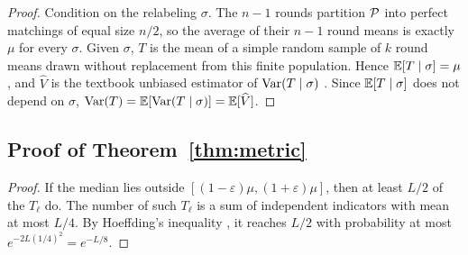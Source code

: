 
\begin{proof}
Condition on the relabeling $\sigma$. The $n-1$ rounds partition $\mathcal{P}$ into
perfect matchings of equal size $n/2$, so the average of their $n-1$ round means
is exactly $\mu$ for every $\sigma$. Given $\sigma$, $T$ is the mean of a simple
random sample of $k$ round means drawn without replacement from this finite
population. Hence $\mathbb{E}[T\mid\sigma]=\mu$, and $\widehat V$ is the textbook unbiased
estimator of $\operatorname{Var}(T\mid\sigma)$ \citep{cochran1977sampling}. Since
$\mathbb{E}[T\mid\sigma]$ does not depend on $\sigma$,
$\operatorname{Var}(T)=\mathbb{E}[\operatorname{Var}(T\mid\sigma)]=\mathbb{E}[\widehat V]$.
\end{proof}

\subsection{Proof of Theorem~\ref{thm:metric}}
\label{app:metric}


\begin{proof}
If the median lies outside $[(1-\varepsilon)\mu,(1+\varepsilon)\mu]$, then at least
$L/2$ of the $T_\ell$ do. The number of such $T_\ell$ is a sum of independent
indicators with mean at most $L/4$. By Hoeffding's inequality
\citep{hoeffding1963probability}, it reaches $L/2$ with probability at most
$e^{-2L(1/4)^2}=e^{-L/8}$.
\end{proof}

